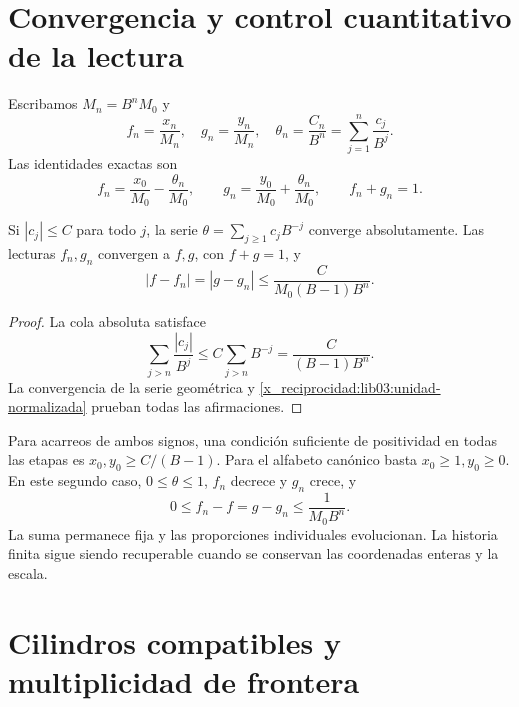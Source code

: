 \section{Convergencia y control cuantitativo de la lectura}
\label{x_reciprocidad:lib03:limite}

Escribamos \(M_n=B^nM_0\) y
\begin{equation}
 f_n=\frac{x_n}{M_n},\quad g_n=\frac{y_n}{M_n},\quad
 \theta_n=\frac{C_n}{B^n}=\sum_{j=1}^n\frac{c_j}{B^j}.
 \label{x_reciprocidad:lib03:lecturas-normalizadas}
\end{equation}
Las identidades exactas son
\begin{equation}
 f_n=\frac{x_0}{M_0}-\frac{\theta_n}{M_0},\qquad
 g_n=\frac{y_0}{M_0}+\frac{\theta_n}{M_0},\qquad f_n+g_n=1.
 \label{x_reciprocidad:lib03:unidad-normalizada}
\end{equation}

\begin{theorem}
\label{x_reciprocidad:lib03:teo-limite}
Si \(|c_j|\leq C\) para todo \(j\), la serie
\(\theta=\sum_{j\geq1}c_jB^{-j}\) converge absolutamente. Las
lecturas \(f_n,g_n\) convergen a \(f,g\), con \(f+g=1\), y
\begin{equation}
 |f-f_n|=|g-g_n|\leq\frac{C}{M_0(B-1)B^n}.
 \label{x_reciprocidad:lib03:cota-cola}
\end{equation}
\end{theorem}

\begin{proof}
La cola absoluta satisface
\[
 \sum_{j>n}\frac{|c_j|}{B^j}
 \leq C\sum_{j>n}B^{-j}=\frac{C}{(B-1)B^n}.
\]
La convergencia de la serie geométrica y
\eqref{x_reciprocidad:lib03:unidad-normalizada} prueban todas las afirmaciones.
\end{proof}

Para acarreos de ambos signos, una condición suficiente de positividad
en todas las etapas es \(x_0,y_0\geq C/(B-1)\). Para el alfabeto
canónico basta \(x_0\geq1,y_0\geq0\). En este segundo caso,
\(0\leq\theta\leq1\), \(f_n\) decrece y \(g_n\) crece, y
\begin{equation}
 0\leq f_n-f=g-g_n\leq\frac1{M_0B^n}.
 \label{x_reciprocidad:lib03:cota-canonica}
\end{equation}
La suma permanece fija y las proporciones individuales evolucionan.
La historia finita sigue siendo recuperable cuando se conservan las
coordenadas enteras y la escala.

\section{Cilindros compatibles y multiplicidad de frontera}
\label{x_reciprocidad:lib03:cilindros}

